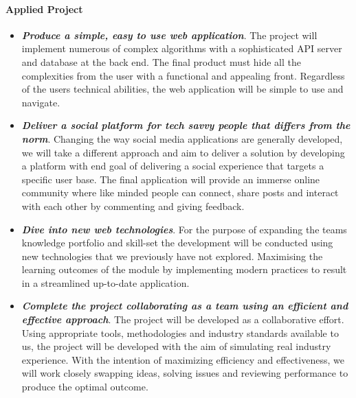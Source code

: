  \paragraph{Applied Project}
\begin{itemize}
\item \textit{\textbf{Produce a simple, easy to use web application}}. The project will implement numerous of complex algorithms with a sophisticated API server and database at the back end. The final product must hide all the complexities from the user with a functional and appealing front. Regardless of the users technical abilities, the web application will be simple to use and navigate.
\item \textit{\textbf{Deliver a social platform for tech savvy people that differs from the norm}}. Changing the way social media applications are generally developed, we will take a different approach and aim to deliver a solution by developing a platform with end goal of delivering a social experience that targets a specific user base. The final application will provide an immerse online community where like minded people can connect, share posts and interact with each other by commenting and giving feedback.
\item \textit{\textbf{Dive into new web technologies}}. For the purpose of expanding the teams knowledge portfolio and skill-set the development will be conducted using new technologies that we previously have not explored. Maximising the learning outcomes of the module by implementing modern practices to result in a streamlined up-to-date application.
\item \textit{\textbf{Complete the project collaborating as a team using an efficient and effective approach}}. The project will be developed as a collaborative effort. Using appropriate tools, methodologies and industry standards available to us, the project will be developed with the aim of simulating real industry experience. With the intention of maximizing efficiency and effectiveness, we will work closely swapping ideas, solving issues and reviewing performance to produce the optimal outcome.
\end{itemize}


